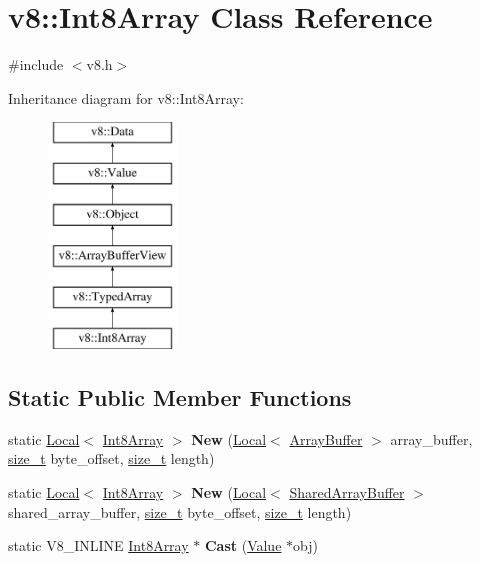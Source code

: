 \hypertarget{classv8_1_1Int8Array}{}\section{v8\+:\+:Int8\+Array Class Reference}
\label{classv8_1_1Int8Array}


{\ttfamily \#include $<$v8.\+h$>$}

Inheritance diagram for v8\+:\+:Int8\+Array\+:\begin{figure}[H]
\begin{center}
\leavevmode
\includegraphics[height=6.000000cm]{classv8_1_1Int8Array}
\end{center}
\end{figure}
\subsection*{Static Public Member Functions}
\begin{DoxyCompactItemize}
\item 
\mbox{\label{classv8_1_1Int8Array_a13e12d1a556aa2ef92271484a10acd21}} 
static \mbox{\hyperlink{classv8_1_1Local}{Local}}$<$ \mbox{\hyperlink{classv8_1_1Int8Array}{Int8\+Array}} $>$ {\bfseries New} (\mbox{\hyperlink{classv8_1_1Local}{Local}}$<$ \mbox{\hyperlink{classv8_1_1ArrayBuffer}{Array\+Buffer}} $>$ array\+\_\+buffer, \mbox{\hyperlink{classsize__t}{size\+\_\+t}} byte\+\_\+offset, \mbox{\hyperlink{classsize__t}{size\+\_\+t}} length)
\item 
\mbox{\label{classv8_1_1Int8Array_a364d52f1dc634e637321b2a9f9ec4dd8}} 
static \mbox{\hyperlink{classv8_1_1Local}{Local}}$<$ \mbox{\hyperlink{classv8_1_1Int8Array}{Int8\+Array}} $>$ {\bfseries New} (\mbox{\hyperlink{classv8_1_1Local}{Local}}$<$ \mbox{\hyperlink{classv8_1_1SharedArrayBuffer}{Shared\+Array\+Buffer}} $>$ shared\+\_\+array\+\_\+buffer, \mbox{\hyperlink{classsize__t}{size\+\_\+t}} byte\+\_\+offset, \mbox{\hyperlink{classsize__t}{size\+\_\+t}} length)
\item 
\mbox{\label{classv8_1_1Int8Array_a201a6b46e2cc455830d62c57bc8b4a3e}} 
static V8\+\_\+\+I\+N\+L\+I\+NE \mbox{\hyperlink{classv8_1_1Int8Array}{Int8\+Array}} $\ast$ {\bfseries Cast} (\mbox{\hyperlink{classv8_1_1Value}{Value}} $\ast$obj)
\end{DoxyCompactItemize}

